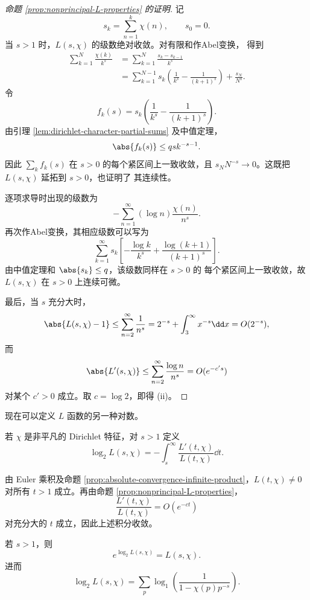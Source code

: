 \begin{proof}[命题 \ref{prop:nonprincipal-L-properties} 的证明]
	记
	\[
	s_k=\sum_{n=1}^{k}\chi(n),
	\qquad s_0=0.
	\]
	当 $s>1$ 时，$L(s,\chi)$ 的级数绝对收敛。对有限和作Abel变换，
	得到
	\[
	\begin{aligned}
	\sum_{k=1}^{N}\frac{\chi(k)}{k^s}
	&=\sum_{k=1}^{N}\frac{s_k-s_{k-1}}{k^s}\\
	&=\sum_{k=1}^{N-1}s_k
	\left(\frac1{k^s}-\frac1{(k+1)^s}\right)
	+\frac{s_N}{N^s}.
	\end{aligned}
	\]
	令
	\[
	f_k(s)=s_k\left(\frac1{k^s}-\frac1{(k+1)^s}\right).
	\]
	由引理 \ref{lem:dirichlet-character-partial-sums} 及中值定理，
	\[
	\abs{f_k(s)}\leq qs k^{-s-1}.
	\]
	因此 $\sum\limits_k f_k(s)$ 在 $s>0$ 的每个紧区间上一致收敛，且
$s_NN^{-s}\to0$。这既把 $L(s,\chi)$ 延拓到 $s>0$，也证明了
	其连续性。

	逐项求导时出现的级数为
	\[
	-\sum_{n=1}^{\infty}(\log n)\frac{\chi(n)}{n^s}.
	\]
	再次作Abel变换，其相应级数可以写为
	\[
	\sum_{k=1}^{\infty}s_k
	\left[-\frac{\log k}{k^s}
	+\frac{\log(k+1)}{(k+1)^s}\right].
	\]
	由中值定理和 $\abs{s_k}\leq q$，该级数同样在 $s>0$ 的
	每个紧区间上一致收敛，故 $L(s,\chi)$ 在 $s>0$ 上连续可微。

	最后，当 $s$ 充分大时，
	\[
	\abs{L(s,\chi)-1}
	\leq\sum_{n=2}^{\infty}\frac1{n^s}
	=2^{-s}+\int_{3}^{\infty}x^{-s}\dd x=O(2^{-s}),
	\]
	而
	\[
	\abs{L'(s,\chi)}
	\leq\sum_{n=2}^{\infty}\frac{\log n}{n^s}
	=O(e^{-c's})
	\]
	对某个 $c'>0$ 成立。取 $c=\log2$，即得 \textup{(ii)}。
\end{proof}

现在可以定义 $L$ 函数的另一种对数。

\begin{definition}
	若 $\chi$ 是非平凡的
Dirichlet 特征，对 $s>1$ 定义
\begin{equation}\label{eq:log-two-L-definition}
	\log_2L(s,\chi)
	=-\int_s^{\infty}\frac{L'(t,\chi)}{L(t,\chi)}\dd t.
\end{equation}
\end{definition}
由 Euler 乘积及命题
\ref{prop:absolute-convergence-infinite-product}，$L(t,\chi)\neq0$
对所有 $t>1$ 成立。再由命题
\ref{prop:nonprincipal-L-properties}，
\[
\frac{L'(t,\chi)}{L(t,\chi)}=O(e^{-ct})
\]
对充分大的 $t$ 成立，因此上述积分收敛。

\begin{proposition}\label{prop:two-logarithms-for-L}
	若 $s>1$，则
	\[
	e^{\log_2L(s,\chi)}=L(s,\chi).
	\]
	进而
	\[
	\log_2L(s,\chi)
	=\sum_p\log_1\left(
	\frac1{1-\chi(p)p^{-s}}
	\right).
	\]
\end{proposition}

